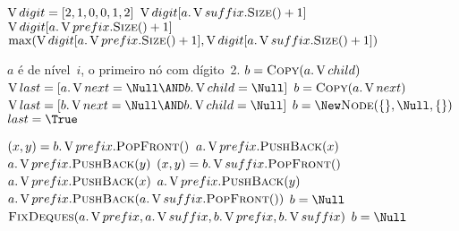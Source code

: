 \documentclass[../../main.tex]{subfiles}
\begin{document}
\begin{algorithm}
\begin{algorithmic}[1]

    \State $\operatorname{V}{digit} = [2, 1, 0, 0, 1, 2]$ 
        \State \Return $\V{digit}[a.\V{suffix}.\Call{Size}{\null} + 1]$
        \State \Return $\V{digit}[a.\V{prefix}.\Call{Size}{\null} + 1]$
    \Else
        \State \Return $\max(\V{digit}[a.\V{prefix}.\Call{Size}{\null} + 1], \V{digit}[a.\V{suffix}.\Call{Size}{\null} + 1])$
    \EndIf
\EndFunction

\Require $a$ é de nível~$i$, o primeiro nó com dígito~2.
     \label{line:fix:p1b}
        \State $b = \Call{Copy}{a.\V{child}}$
        \State $\V{last} = [a.\V{next} = \Null \AND b.\V{child} = \Null]$
        \State $b = \Call{Copy}{a.\V{next}}$
        \State $\V{last} = [b.\V{next} = \Null \AND b.\V{child} = \Null]$
    \Else
        \State $b = \New \Call{Node}{\{\}, \Null, \{\}}$
        \State $last = \True$ \label{line:fix:p1e}
    \EndIf

       \label{line:fix:p2b}
            \State $(x, y) = b.\V{prefix}.\Call{PopFront}{\null}$
            \State $a.\operatorname{V}{prefix}.\textsc{PushBack}(x)$
            \State $a.\operatorname{V}{prefix}.\textsc{PushBack}(y)$
        \EndIf
            \State $(x, y) = b.\V{suffix}.\Call{PopFront}{\null}$
            \State $a.\operatorname{V}{prefix}.\textsc{PushBack}(x)$
            \State $a.\operatorname{V}{prefix}.\textsc{PushBack}(y)$
        \EndIf
            \State $a.\V{prefix}.\textsc{PushBack}(a.\V{suffix}.\Call{PopFront}{\null})$
        \EndIf
        \State $b = \Null$  \label{line:fix:p2e}
    \Else {}  \label{line:fix:p3b}
        \State $\Call{FixDeques}{a.\V{prefix}, a.\V{suffix}, b.\V{prefix}, b.\V{suffix}}$
         \label{line:fix:if_empty}
            \State $b = \Null$  \label{line:fix:p3e}
        \EndIf
    \EndIf


\end{algorithmic}
\end{algorithm}
\end{document}
